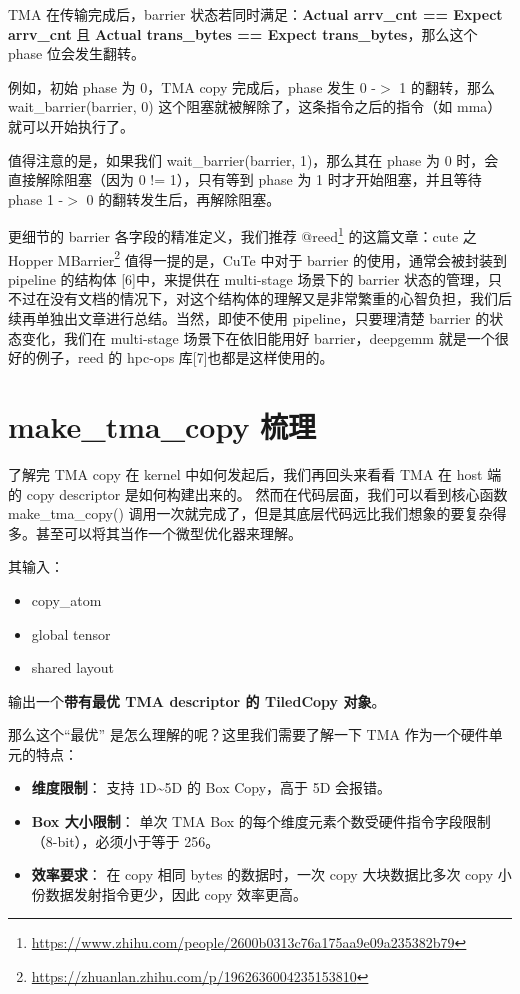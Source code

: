 TMA 在传输完成后，barrier 状态若同时满足：\textbf{Actual arrv\_cnt == Expect arrv\_cnt} 且 \textbf{Actual trans\_bytes == Expect trans\_bytes}，那么这个 phase 位会发生翻转。

例如，初始 phase 为 0，TMA copy 完成后，phase 发生 0 -$>$ 1 的翻转，那么 wait\_barrier(barrier, 0) 这个阻塞就被解除了，这条指令之后的指令（如 mma）就可以开始执行了。

值得注意的是，如果我们 wait\_barrier(barrier, 1)，那么其在 phase 为 0 时，会直接解除阻塞（因为 0 != 1），只有等到 phase 为 1 时才开始阻塞，并且等待 phase 1 -$>$ 0 的翻转发生后，再解除阻塞。

更细节的 barrier 各字段的精准定义，我们推荐 @reed\footnote{\url{https://www.zhihu.com/people/2600b0313c76a175aa9e09a235382b79}}  的这篇文章：cute 之 Hopper MBarrier\footnote{\url{https://zhuanlan.zhihu.com/p/1962636004235153810}}
值得一提的是，CuTe 中对于 barrier 的使用，通常会被封装到pipeline 的结构体 [6]中，来提供在 multi-stage 场景下的 barrier 状态的管理，只不过在没有文档的情况下，对这个结构体的理解又是非常繁重的心智负担，我们后续再单独出文章进行总结。当然，即使不使用 pipeline，只要理清楚 barrier 的状态变化，我们在 multi-stage 场景下在依旧能用好 barrier，deepgemm 就是一个很好的例子，reed 的 hpc-ops 库[7]也都是这样使用的。

\section{make\_tma\_copy 梳理}

了解完 TMA copy 在 kernel 中如何发起后，我们再回头来看看 TMA 在 host 端的 copy descriptor 是如何构建出来的。 然而在代码层面，我们可以看到核心函数 make\_tma\_copy() 调用一次就完成了，但是其底层代码远比我们想象的要复杂得多。甚至可以将其当作一个微型优化器来理解。

其输入：

\begin{itemize}
  \item copy\_atom
  \item global tensor
  \item shared layout
\end{itemize}

输出一个\textbf{带有最优 TMA descriptor 的 TiledCopy 对象}。

那么这个“最优” 是怎么理解的呢？这里我们需要了解一下 TMA 作为一个硬件单元的特点：

\begin{itemize}
  \item \textbf{维度限制}： 支持 1D\textasciitilde{}5D 的 Box Copy，高于 5D 会报错。
  \item \textbf{Box 大小限制}： 单次 TMA Box 的每个维度元素个数受硬件指令字段限制（8-bit），必须小于等于 256。
  \item \textbf{效率要求}： 在 copy 相同 bytes 的数据时，一次 copy 大块数据比多次 copy 小份数据发射指令更少，因此 copy 效率更高。
\end{itemize}

